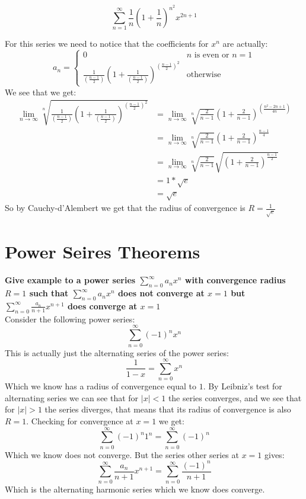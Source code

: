 \documentclass[11pt,a4paper]{article}
\begin{document}
	\newpage
	
	\[
	\sum_{n=1}^{\infty}{\frac{1}{n}\left(1+\frac{1}{n}\right)^{n^2}x^{2n+1}}
	\]
	
	For this series we need to notice that the coefficients for $x^n$ are
	actually:
	\[
	a_n = 
		\begin{cases}
			0 & \text{$n$ is even or $n=1$} \\
			\frac{1}{(\frac{n-1}{2})}\left(1+\frac{1}{(\frac{n-1}{2})
			}\right)^{(\frac{n-1}{2})^2} & \text{otherwise}
		\end{cases}
	\]
	We see that we get:
	\begin{align*}
		\lim_{n\to\infty}
		{
			\sqrt[n]
			{\frac{1}{(\frac{n-1}{2})}\left(1+\frac{1}{(\frac{n-1}{2})
			}\right)^{(\frac{n-1}{2})^2}}
		} &= 
		\lim_{n\to\infty}
		{
			\sqrt[n]{\frac{2}{n-1}}\left(1+\frac{2}{n-1
			}\right)^{(\frac{n^2-2n+1}{4n})}
		} \\ &= 
		\lim_{n\to\infty}
		{
			\sqrt[n]
			{\frac{2}{n-1}}\left(1+\frac{2}{n-1}\right)^{\frac{n-1}{4}}
		} \\ &= 
		\lim_{n\to\infty}
		{
			\sqrt[n]{\frac{2}{n-1}}
			\sqrt{\left(1+\frac{2}{n-1}\right)^{\frac{n-1}{2}}}
		} \\ &= 1*\sqrt{e} \\ &= \sqrt{e}
	\end{align*}
	So by Cauchy-d'Alembert we get that the radius of convergence is 
	$R = \frac{1}{\sqrt{e}}$
	
	\newpage
	
	\section{Power Seires Theorems}
	
	\textbf{Give example to a power series $\sum_{n=0}^{\infty}{a_n x^n}$ 
	with convergence radius $R=1$ such that $\sum_{n=0}^{\infty}{a_n x^n}$ 
	does not converge at $x=1$ but 
	$\sum_{n=0}^{\infty}{\frac{a_n}{n+1} x^{n+1}}$ does converge at $x=1$} \\
	Consider the following power series:
	\[
		\sum_{n=0}^{\infty}{(-1)^n x^n}
	\]
	This is actually just the alternating series of the power series:
	\[
		\frac{1}{1-x} = \sum_{n=0}^{\infty}{x^n}
	\]
	Which we know has a radius of convergence equal to $1$. By Leibniz's
	test for alternating series we can see that for $|x| < 1$ the series
	converges, and we see that for $|x| > 1$ the series diverges, that
	means that its radius of convergence is also $R=1$. Checking for 
	convergence at $x=1$ we get:
	\[
		\sum_{n=0}^{\infty}{(-1)^n 1^n} = 
		\sum_{n=0}^{\infty}{(-1)^n}
	\]
	Which we know does not converge. But the series other series at $x=1$ 
	gives:
	\[
		\sum_{n=0}^{\infty}{\frac{a_n}{n+1} x^{n+1}} =
		\sum_{n=0}^{\infty}{\frac{(-1)^n}{n+1}}
	\]
	Which is the alternating harmonic series which we know does converge.
	
\end{document}
